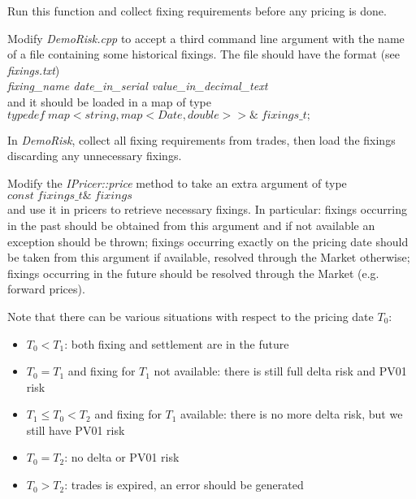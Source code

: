 \documentclass[10pt]{article}
\begin{document}
Run this function and collect fixing requirements before any pricing is done.

Modify \textit{DemoRisk.cpp} to accept a third command line argument with the name of a file containing some historical fixings. The file should have the format (see \textit{fixings.txt})\\
\textit{fixing\_name date\_in\_serial value\_in\_decimal\_text}\\
and it should be loaded in a map of type\\
$typedef\; map<string,map<Date,double>>\&\; fixings\_t;$

In \textit{DemoRisk}, collect all fixing requirements from trades, then load the fixings discarding any unnecessary fixings.

Modify the \textit{IPricer::price} method to take an extra argument of type\\ $const\; fixings\_t\&\; fixings$\\ and use it in pricers to retrieve necessary fixings. In particular: fixings occurring in the past should be obtained from this argument and if not available an exception should be thrown; fixings occurring exactly on the pricing date should be taken from this argument if available, resolved through the Market otherwise; fixings occurring in the future should be resolved through the Market (e.g. forward prices).

Note that there can be various situations with respect to the pricing date $T_0$:
\begin{itemize}
	\item $T_0< T_1$: both fixing and settlement are in the future
	\item $T_0 = T_1$ and fixing for $T_1$ not available: there is still full delta risk and PV01 risk
	\item $ T_1 \leq T_0 < T_2$ and fixing for $T_1$ available: there is no more delta risk, but we still have PV01 risk
	\item $T_0 = T_2$: no delta or PV01 risk
	\item $T_0 > T_2$: trades is expired, an error should be generated
\end{itemize}
\end{document}
